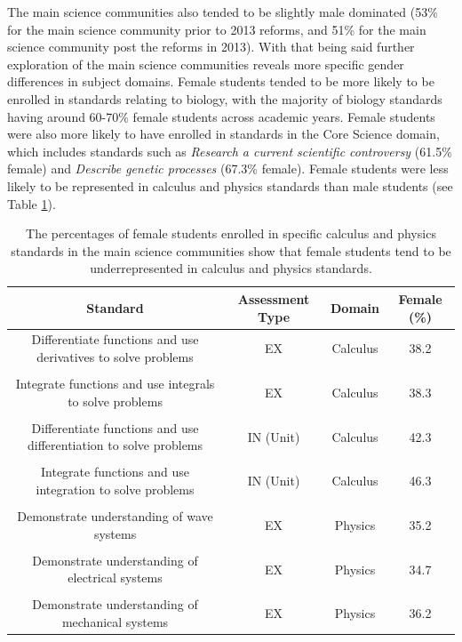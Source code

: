 The main science communities also tended to be slightly male dominated (53\% for the main science community prior to 2013 reforms, and 51\% for the main science community post the reforms in 2013). With that being said further exploration of the main science communities reveals more specific gender differences in subject domains. Female students tended to be more likely to be enrolled in standards relating to biology, with the majority of biology standards having around 60-70\% female students across academic years. Female students were also more likely to have enrolled in standards in the Core Science domain, which includes standards such as \textit{Research a current scientific controversy} (61.5\% female) and \textit{Describe genetic processes} (67.3\% female). Female students were less likely to be represented in calculus and physics standards than male students (see Table \ref{table:StdattainmentGender}). 

\begin{table}[ht!]
\begin{tabular}{|c|c|c|c|}
\hline
Standard & Assessment Type & Domain   & Female (\%) \\ \hline
     Differentiate functions and use derivatives to solve problems & EX & Calculus & 38.2\\
      & & & \\
     Integrate functions and use integrals to solve problems & EX & Calculus & 38.3\\
      & & & \\
     Differentiate functions and use differentiation to solve problems & IN (Unit) & Calculus  &    42.3   \\
     & & & \\
     Integrate functions and use integration to solve problems & IN (Unit) & Calculus & 46.3\\
      & & & \\
      Demonstrate understanding of wave systems & EX & Physics  &  35.2\\
      & & & \\
     Demonstrate understanding of electrical systems & EX & Physics  & 34.7 \\
      & & & \\
      Demonstrate understanding of mechanical systems & EX & Physics & 36.2 
      \\ \hline
\end{tabular}  \caption{The percentages of female students enrolled in specific calculus and physics standards in the main science communities show that female students tend to be underrepresented in calculus and physics standards.}  \label{table:StdattainmentGender}

\end{table}


